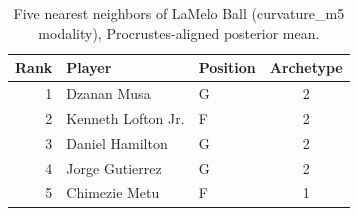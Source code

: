 \begin{table}[htbp]
  \centering\small
  \begin{tabular}{rllc}
    \toprule
    Rank & Player & Position & Archetype \\
    \midrule
    1 & Dzanan Musa & G & 2 \\
    2 & Kenneth Lofton Jr. & F & 2 \\
    3 & Daniel Hamilton & G & 2 \\
    4 & Jorge Gutierrez & G & 2 \\
    5 & Chimezie Metu & F & 1 \\
    \bottomrule
  \end{tabular}
  \caption{Five nearest neighbors of LaMelo Ball (curvature_m5 modality), Procrustes-aligned posterior mean.}
  \label{tab:LaMelo_Ball_neighbors_curvature_m5}
\end{table}

